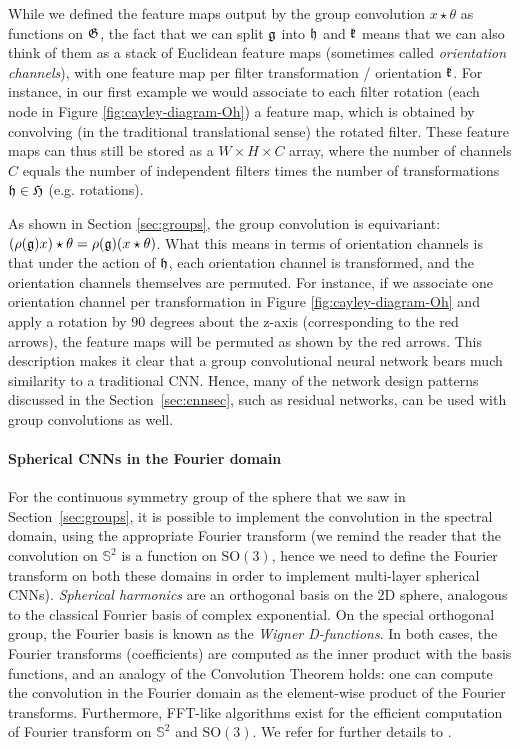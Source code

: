 While we defined the feature maps output by the group convolution $x \star \theta$ as functions on ${\mathfrak{G}}$, the fact that we can split ${\mathfrak{g}}$ into ${\mathfrak{h}}$ and ${\mathfrak{k}}$ means that we can also think of them as a stack of Euclidean feature maps (sometimes called \emph{orientation channels}), with one feature map per filter transformation / orientation ${\mathfrak{k}}$.
For instance, in our first example we would associate to each filter rotation (each node in Figure \ref{fig:cayley-diagram-Oh}) a feature map, which is obtained by 
convolving (in the traditional translational sense) the rotated filter. 
These feature maps can thus still be stored as a $W \times H \times C$ array, where the number of channels $C$ equals the number of independent filters times the number of transformations ${\mathfrak{h}} \in {\mathfrak{H}}$ (e.g. rotations).

As shown in Section \ref{sec:groups}, the group convolution is equivariant: $(\rho({\mathfrak{g}}) x) \star \theta = \rho({\mathfrak{g}}) (x \star \theta)$.
What this means in terms of orientation channels is that under the action of ${\mathfrak{h}}$, each orientation channel is transformed, and the orientation channels themselves are permuted.
For instance, if we associate one orientation channel per transformation in Figure  \ref{fig:cayley-diagram-Oh} and apply a rotation by $90$ degrees about the z-axis (corresponding to the red arrows), the feature maps will be permuted as shown by the red arrows.
%
This description makes it clear that a group convolutional neural network bears much similarity to a traditional CNN. 
Hence, many of the network design patterns discussed in the Section~\ref{sec:cnnsec}, such as residual networks, can be used with group convolutions as well. 




\paragraph{Spherical CNNs in the Fourier domain}
For the continuous symmetry group of the sphere that we saw in Section~\ref{sec:groups}, it is possible to implement the convolution in the spectral domain, using the appropriate  Fourier transform (we remind the reader that the convolution on $\mathbb{S}^2$ is a function on $\mathrm{SO}(3)$, hence we need to define the Fourier transform on both these domains in order to implement multi-layer spherical CNNs). 
%
{\em Spherical harmonics} are an orthogonal basis on the 2D sphere,  analogous to the classical Fourier basis of complex exponential. 
%
On the special orthogonal group, the Fourier basis is known as the {\em Wigner D-functions}. %
In both cases, the Fourier transforms (coefficients) are computed as the inner product with the basis functions, and an analogy of the Convolution Theorem holds: one can compute the convolution in the Fourier domain as the element-wise product of the Fourier transforms. 
%
Furthermore, FFT-like algorithms exist for the efficient computation of Fourier transform on $\mathbb{S}^2$ and $\mathrm{SO}(3)$. We refer for further details to \cite{cohen2018spherical}.  



